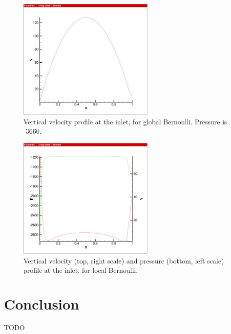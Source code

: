 \documentclass[12pt]{article}
\begin{document}
\begin{figure}[h!]
\centering
\includegraphics[width=0.6\textwidth]{figs/GB-v}
\caption{Vertical velocity profile at the inlet, for global
  Bernoulli. Pressure is -3660.}
\label{fig:GB-v}
\end{figure}

\begin{figure}[h!]
\centering
\includegraphics[width=0.6\textwidth]{figs/LB-pv}
\caption{Vertical velocity (top, right scale) and pressure (bottom,
  left scale) profile at the inlet, for local Bernoulli.}
\label{fig:LB-pv}
\end{figure}


\section{Conclusion}
TODO

\listoffigures
\listoftables




\end{document}
